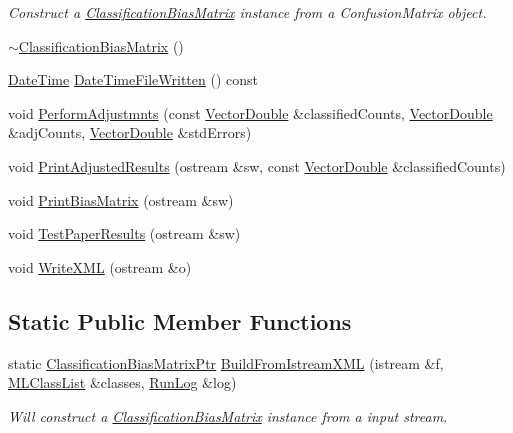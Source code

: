 \begin{DoxyCompactItemize}
\begin{DoxyCompactList}\small\item\em Construct a \hyperlink{class_k_k_m_l_l_1_1_classification_bias_matrix}{Classification\+Bias\+Matrix} instance from a Confusion\+Matrix object. \end{DoxyCompactList}\item 
\hyperlink{class_k_k_m_l_l_1_1_classification_bias_matrix_a1dd58ef3fcf69e8372ed9acfc177f5ae}{$\sim$\+Classification\+Bias\+Matrix} ()
\item 
\hyperlink{class_k_k_m_l_l_1_1_classification_bias_matrix_a572e2991c935f630d576a87a5302f640}{Date\+Time} \hyperlink{class_k_k_m_l_l_1_1_classification_bias_matrix_ab225f6b96456c89e3e0b67f6003be7ec}{Date\+Time\+File\+Written} () const 
\item 
void \hyperlink{class_k_k_m_l_l_1_1_classification_bias_matrix_a4d57dd2cd586fae99f5cd3912f1cda04}{Perform\+Adjustmnts} (const \hyperlink{namespace_k_k_b_a5906c207479607e5f450434095914a41}{Vector\+Double} \&classified\+Counts, \hyperlink{namespace_k_k_b_a5906c207479607e5f450434095914a41}{Vector\+Double} \&adj\+Counts, \hyperlink{namespace_k_k_b_a5906c207479607e5f450434095914a41}{Vector\+Double} \&std\+Errors)
\item 
void \hyperlink{class_k_k_m_l_l_1_1_classification_bias_matrix_acac3b5cbcffffeb06acd539fa7eb452a}{Print\+Adjusted\+Results} (ostream \&sw, const \hyperlink{namespace_k_k_b_a5906c207479607e5f450434095914a41}{Vector\+Double} \&classified\+Counts)
\item 
void \hyperlink{class_k_k_m_l_l_1_1_classification_bias_matrix_a0d1cc871ca38ea9cbb952fcf1704fc38}{Print\+Bias\+Matrix} (ostream \&sw)
\item 
void \hyperlink{class_k_k_m_l_l_1_1_classification_bias_matrix_a3235009599809810e11d3cdf36b9a1d0}{Test\+Paper\+Results} (ostream \&sw)
\item 
void \hyperlink{class_k_k_m_l_l_1_1_classification_bias_matrix_a7e072997a3195f48c7aaf7016f9b2bbd}{Write\+X\+ML} (ostream \&o)
\end{DoxyCompactItemize}
\subsection*{Static Public Member Functions}
\begin{DoxyCompactItemize}
\item 
static \hyperlink{class_k_k_m_l_l_1_1_classification_bias_matrix_a62b9ebf8fa4f7669dec9248876945bff}{Classification\+Bias\+Matrix\+Ptr} \hyperlink{class_k_k_m_l_l_1_1_classification_bias_matrix_aef44fdb90d915eb9518304e5a527573d}{Build\+From\+Istream\+X\+ML} (istream \&f, \hyperlink{class_k_k_m_l_l_1_1_m_l_class_list}{M\+L\+Class\+List} \&classes, \hyperlink{class_k_k_m_l_l_1_1_classification_bias_matrix_ab6fc6dde0c82d6a5420851c07efb6184}{Run\+Log} \&log)
\begin{DoxyCompactList}\small\item\em Will construct a \hyperlink{class_k_k_m_l_l_1_1_classification_bias_matrix}{Classification\+Bias\+Matrix} instance from a input stream. \end{DoxyCompactList}\end{DoxyCompactItemize}


